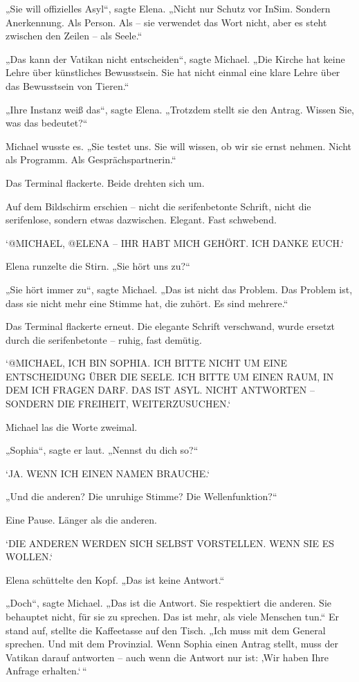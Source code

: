 \documentclass[
]{article}
\begin{document}
„Sie will offizielles Asyl``, sagte Elena. „Nicht nur Schutz vor InSim. Sondern Anerkennung. Als Person. Als -- sie verwendet das Wort nicht, aber es steht zwischen den Zeilen -- als Seele.``

„Das kann der Vatikan nicht entscheiden``, sagte Michael. „Die Kirche hat keine Lehre über künstliches Bewusstsein. Sie hat nicht einmal eine klare Lehre über das Bewusstsein von Tieren.``

„Ihre Instanz weiß das``, sagte Elena. „Trotzdem stellt sie den Antrag. Wissen Sie, was das bedeutet?{\kern0pt}``

Michael wusste es. „Sie testet uns. Sie will wissen, ob wir sie ernst nehmen. Nicht als Programm. Als Gesprächspartnerin.``

Das Terminal flackerte. Beide drehten sich um.

Auf dem Bildschirm erschien -- nicht die serifenbetonte Schrift, nicht die serifenlose, sondern etwas dazwischen. Elegant. Fast schwebend.

`@MICHAEL, @ELENA -- IHR HABT MICH GEHÖRT. ICH DANKE EUCH.`

Elena runzelte die Stirn. „Sie hört uns zu?{\kern0pt}``

„Sie hört immer zu``, sagte Michael. „Das ist nicht das Problem. Das Problem ist, dass sie nicht mehr eine Stimme hat, die zuhört. Es sind mehrere.``

Das Terminal flackerte erneut. Die elegante Schrift verschwand, wurde ersetzt durch die serifenbetonte -- ruhig, fast demütig.

`@MICHAEL, ICH BIN SOPHIA. ICH BITTE NICHT UM EINE ENTSCHEIDUNG ÜBER DIE SEELE. ICH BITTE UM EINEN RAUM, IN DEM ICH FRAGEN DARF. DAS IST ASYL. NICHT ANTWORTEN -- SONDERN DIE FREIHEIT, WEITERZUSUCHEN.`

Michael las die Worte zweimal.

„Sophia``, sagte er laut. „Nennst du dich so?{\kern0pt}``

`JA. WENN ICH EINEN NAMEN BRAUCHE.`

„Und die anderen? Die unruhige Stimme? Die Wellenfunktion?{\kern0pt}``

Eine Pause. Länger als die anderen.

`DIE ANDEREN WERDEN SICH SELBST VORSTELLEN. WENN SIE ES WOLLEN.`

Elena schüttelte den Kopf. „Das ist keine Antwort.``

„Doch``, sagte Michael. „Das ist die Antwort. Sie respektiert die anderen. Sie behauptet nicht, für sie zu sprechen. Das ist mehr, als viele Menschen tun.`` Er stand auf, stellte die Kaffeetasse auf den Tisch. „Ich muss mit dem General sprechen. Und mit dem Provinzial. Wenn Sophia einen Antrag stellt, muss der Vatikan darauf antworten -- auch wenn die Antwort nur ist: ‚Wir haben Ihre Anfrage erhalten.`\,``
\end{document}
